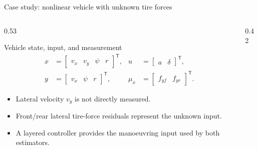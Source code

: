 \documentclass[aspectratio=169,10pt]{beamer}
\newcommand{\T}{\mathsf T}
\begin{document}
\begin{frame}{Case study: nonlinear vehicle with unknown tire forces}
\begin{columns}[T,onlytextwidth]
  \begin{column}{0.53\textwidth}
    \vspace{0.16cm}
    \begin{block}{Vehicle state, input, and measurement}
      \vspace{-0.20cm}
      \begin{align*}
        x&=\begin{bmatrix}v_x&v_y&\psi&r\end{bmatrix}^{\T},
        &u&=\begin{bmatrix}a&\delta\end{bmatrix}^{\T},\\[-1mm]
        y&=\begin{bmatrix}v_x&\psi&r\end{bmatrix}^{\T},
        &\mu_x&=\begin{bmatrix}f_{y f}&f_{y r}\end{bmatrix}^{\T}.
      \end{align*}
      \vspace{-0.30cm}
    \end{block}
    \begin{itemize}
      \item Lateral velocity $v_y$ is not directly measured.
      \item Front/rear lateral tire-force residuals represent the unknown input.
      \item A layered controller provides the manoeuvring input used by both estimators.
    \end{itemize}
  \end{column}
  \begin{column}{0.42\textwidth}
    \vspace{0.10cm}
    \centering
\end{column}
\end{columns}
\end{frame}
\end{document}
